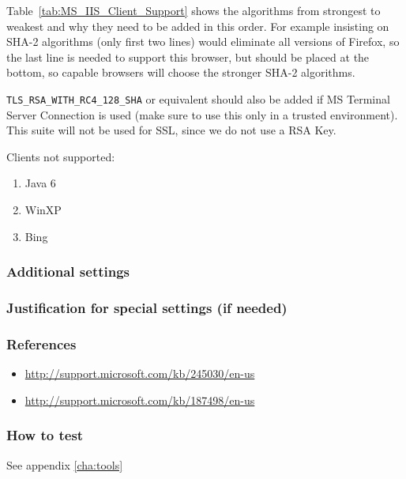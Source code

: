 Table~\ref{tab:MS_IIS_Client_Support} shows the algorithms from
strongest to weakest and why they need to be added in this order. For
example insisting on SHA-2 algorithms (only first two lines) would
eliminate all versions of Firefox, so the last line is needed to
support this browser, but should be placed at the bottom, so capable
browsers will choose the stronger SHA-2 algorithms.

\verb|TLS_RSA_WITH_RC4_128_SHA| or equivalent should also be added if
MS Terminal Server Connection is used (make sure to use this only in a
trusted environment). This suite will not be used for SSL, since we do
not use a RSA Key.




Clients not supported:
\begin{enumerate}
\item Java 6
\item WinXP
\item Bing
\end{enumerate}

\subsubsection{Additional settings}


\subsubsection{Justification for special settings (if needed)}


\subsubsection{References}


\begin{itemize}
\item \url{http://support.microsoft.com/kb/245030/en-us}
\item \url{http://support.microsoft.com/kb/187498/en-us}
\end{itemize}


\subsubsection{How to test}
See appendix \ref{cha:tools}



